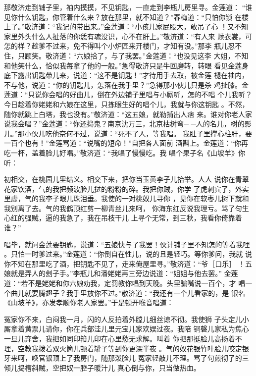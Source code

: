 那敬济走到铺子里，袖内摸摸，不见钥匙，一直走到李瓶儿房里寻。金莲道：
“谁见你什么钥匙，你管着什么来？放在那里，就不知道？”春梅道：“只怕你锁
在楼上了。”敬济道：“我记的带出来。”金莲道：“小孩儿家屁股大，敢吊了心
！又不知家里外头什么人扯落的你恁有魂没识，心不在肝上。”敬济道：“有人来
赎衣裳，可怎的样？趁爹不过来，免不得叫个小炉匠来开楼门，才知有没。”那李
瓶儿忍不住，只顾笑。敬济道：“六娘拾了，与了我罢。”金莲道：“也没见这李
大姐，不知和他笑什么，恰似我每拿了他的一般。”急得敬济只是牛回磨转，转眼
看见金莲身底下露出钥匙带儿来，说道：“这不是钥匙！”才待用手去取，被金莲
褪在袖内，不与他，说道：“你的钥匙儿，怎落在我手里？”急得那小伙儿只是杀
鸡扯膝。金莲道：“只说你会唱的好曲儿，倒在外边铺子里唱与小厮听，怎的不唱
个儿我听？今日趁着你姥姥和六娘在这里，只拣眼生好的唱个儿，我就与你这钥匙
。不然，随你就跳上白塔，我也没有。”敬济道：“这五娘，就勒掯出人痞
来。谁对你老人家说我会唱？”金莲道：“你还捣鬼？南京沈万三，北京枯树弯─
─人的名儿，树的影儿。”那小伙儿吃他奈何不过，说道：“死不了人，等我唱。
我肚子里撑心柱肝，要一百个也有！”金莲骂道：“说嘴的短命！”自把各人面前
酒斟上。金莲道：“你再吃一杯，盖着脸儿好唱。”敬济道：“我唱了慢慢吃。我
唱个果子名《山坡羊》你听：

初相交，在桃园儿里结义。相交下来，把你当玉黄李子儿抬举。人人
说你在青翠花家饮酒，气的我把频波脸儿挝的粉粉的碎。我把你贼，你学
了虎刺宾了，外实里虚，气的我李子眼儿珠泪垂。我使的一对桃奴儿寻你
，见你在软枣儿树下就和我别离了去。气的我鹤顶红剪一柳青丝儿来呵，
你海东红反说我理亏。骂了句生心红的强贼，逼的我急了，我在吊枝干儿
上寻个无常，到三秋，我看你倚靠着谁？”

唱毕，就问金莲要钥匙，说道：“五娘快与了我罢！伙计铺子里不知怎的等着我哩
。只怕一时爹过来。”金莲道：“你倒自在性儿，说的且是轻巧。等你爹问，我就
说你不知在那里吃了酒，把钥匙不见了，走来俺屋里寻。”敬济道：“爷［口乐］
！五娘就是弄人的刽子手。”李瓶儿和潘姥姥再三旁边说道：“姐姐与他去罢。”
金莲道：“若不是姥姥和你六娘劝我，定罚教你唱到天晚。头里骗嘴说一百个，才
唱一个曲儿就要腾翅子？我手里放你不过。”敬济道：“我还有一个儿看家的，是
银名《山坡羊》，亦发孝顺你老人家罢。”于是顿开喉音唱道：

冤家你不来，白闷我一月，闪的人反拍着外膛儿细丝谅不彻。我使狮
子头定儿小厮拿着黄票儿请你，你在兵部洼儿里元宝儿家欢娱过夜。我陪
铜磬儿家私为焦心一旦儿弃舍，我把如同印箝儿印在心里愁无求解。叫着
你把那挺脸儿高扬着不理，空教我拨着双火筒儿顿着罐子等到你更深半夜
。气的奴花银竹叶脸儿咬定银牙来呵，唤官银顶上了我房门，随那泼脸儿
冤家轻敲儿不理。骂了句煎彻了的三倾儿捣槽斜贼，空把奴一腔子暖汁儿
真心倒与你，只当做热血。

